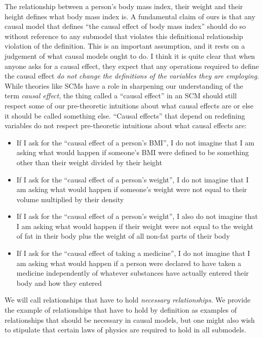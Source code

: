 The relationship between a person's body mass index, their weight and their height defines what body mass index is. A fundamental claim of ours is that any causal model that defines ``the causal effect of body mass index'' should do so without reference to any submodel that violates this definitional relationship violation of the definition. This is an important assumption, and it rests on a judgement of what causal models ought to do. I think it is quite clear that when anyone asks for a causal effect, they expect that any operations required to define the causal effect \emph{do not change the definitions of the variables they are employing}. While theories like SCMs have a role in sharpening our understanding of the term \emph{causal effect}, the thing called a ``causal effect'' in an SCM should still respect some of our pre-theoretic intuitions about what causal effects are or else it should be called something else. ``Causal effects'' that depend on redefining variables do not respect pre-theoretic intuitions about what causal effects are:

\begin{itemize}
	\item If I ask for the ``causal effect of a person's BMI'', I do not imagine that I am asking what would happen if someone's BMI were defined to be something other than their weight divided by their height
	\item If I ask for the ``causal effect of a person's weight'', I do not imagine that I am asking what would happen if someone's weight were not equal to their volume multiplied by their density
	\item If I ask for the ``causal effect of a person's weight'', I also do not imagine that I am asking what would happen if their weight were not equal to the weight of fat in their body plus the weight of all non-fat parts of their body
	\item If I ask for the ``causal effect of taking a medicine'', I do not imagine that I am asking what would happen if a person were declared to have taken a medicine independently of whatever substances have actually entered their body and how they entered
\end{itemize}

We will call relationships that have to hold \emph{necessary relationships}. We provide the example of relationships that have to hold by definition as examples of relationships that should be necessary in causal models, but one might also wish to stipulate that certain laws of physics are required to hold in all submodels.


